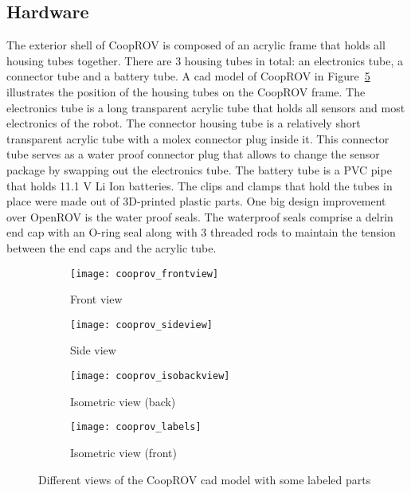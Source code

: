 \subsection{Hardware}

The exterior shell of CoopROV is composed of an acrylic frame that holds all housing tubes together. There are 3 housing tubes in total: an electronics tube, a connector tube and a battery tube. A \gls{cad} model of CoopROV in Figure~\ref{fig:cooprov_cad} illustrates the position of the housing tubes on the CoopROV frame. The electronics tube is a long transparent acrylic tube that holds all sensors and most electronics of the robot. The connector housing tube is a relatively short transparent acrylic tube with a molex connector plug inside it. This connector tube serves as a water proof connector plug that allows to change the sensor package by swapping out the electronics tube. The battery tube is a PVC pipe that holds 11.1 V Li Ion batteries. The clips and clamps that hold the tubes in place were made out of 3D-printed plastic parts. One big design improvement over OpenROV is the water proof seals. The waterproof seals comprise a delrin end cap with an O-ring seal along with 3 threaded rods to maintain 
the tension between the end caps and the acrylic tube. 
%
\begin{figure}	
    \centering
    \begin{subfigure}[]{0.33\textwidth}
        \centering
        \texttt{[image: cooprov\_frontview]}
        \caption{Front view}
        \label{fig:cooprov_frontview}
    \end{subfigure}%
    \begin{subfigure}[]{0.33\textwidth}
        \centering
        \texttt{[image: cooprov\_sideview]}
        \caption{Side view}
        \label{fig:cooprov_sideview}
    \end{subfigure}%
    \begin{subfigure}[]{0.33\textwidth}
        \centering
        \texttt{[image: cooprov\_isobackview]}
        \caption{Isometric view (back)}
        \label{cooprov_isobackview}
    \end{subfigure}
    \begin{subfigure}[]{0.7\textwidth}
        \centering
        \texttt{[image: cooprov\_labels]}
        \caption{Isometric view (front)}
        \label{cooprov_labels}
    \end{subfigure}
    \caption[CoopROV CAD model]{Different views of the CoopROV \gls{cad} model with some labeled parts}
    \label{fig:cooprov_cad}
\end{figure}

